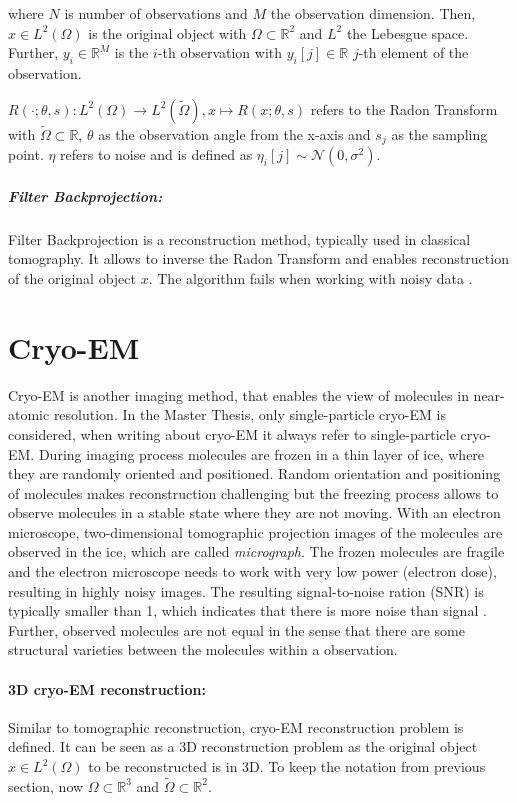 where $N$ is number of observations and $M$ the observation dimension.
Then, $x \in L^2(\Omega)$ is the original object with $\Omega \subset \mathbb{R}^2 $ and $L^2$ the Lebesgue space.
Further, $y_i \in \mathbb{R}^M$ is the $i$-th observation with $y_i[j] \in \mathbb{R}$ $j$-th element of the observation.

$R(\cdot; \theta, s): L^2(\Omega) \to L^2(\tilde{\Omega}) , x \mapsto R(x; \theta,s)$ refers to the Radon Transform\cite{radonTransform} 
with $\tilde{\Omega} \subset \mathbb{R}$, $\theta$ as the observation angle from the x-axis and $s_j$ as the sampling point.
$\eta$ refers to noise and is defined as $\eta_i[j] \sim \mathcal{N}(0,\sigma^2)$.

\subparagraph{Filter Backprojection:}
Filter Backprojection \cite{tomographicReconstruction} is a reconstruction method, typically used in classical tomography.
It allows to inverse the Radon Transform and enables reconstruction of the original object $x$. 
The algorithm fails when working with noisy data \cite{cryoEmMath2}.

\section{Cryo-EM}
Cryo-EM is another imaging method, that enables the view of molecules in near-atomic resolution.
In the Master Thesis, only single-particle cryo-EM\cite{singleParticleCryoEm} is considered, when writing about cryo-EM it always refer to single-particle cryo-EM.
During imaging process molecules are frozen in a thin layer of ice, where they are randomly oriented and positioned. 
Random orientation and positioning of molecules makes reconstruction challenging but
the freezing process allows to observe molecules in a stable state where they are not moving.
With an electron microscope, two-dimensional tomographic projection images of the molecules are observed in the ice,
which are called \textit{micrograph}. The frozen molecules are fragile and the electron microscope needs to work with
very low power (electron dose), resulting in highly noisy images. The resulting signal-to-noise ration (SNR)
is typically smaller than 1, which indicates that there is more noise than signal \cite{cryoEmMath2}.
Further, observed molecules are not equal in the sense that there are some structural varieties between
the molecules within a observation.


\paragraph{3D cryo-EM reconstruction:}
Similar to tomographic reconstruction, cryo-EM reconstruction problem \cite{cryoEmMath} is defined.
It can be seen as a 3D reconstruction problem as the original object $x \in L^2(\Omega)$ to be reconstructed is in 3D.
To keep the notation from previous section, now $\Omega \subset \mathbb{R}^3 $ and $\tilde{\Omega} \subset \mathbb{R}^2 $.

